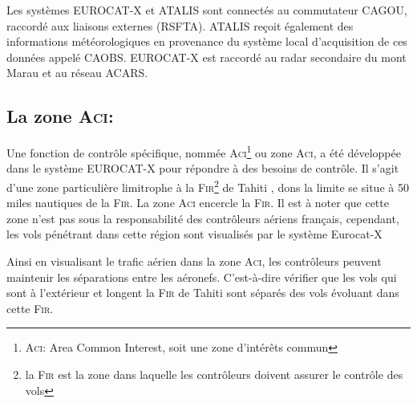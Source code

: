 Les systèmes EUROCAT-X et ATALIS sont connectés au commutateur CAGOU, raccordé aux liaisons externes (RSFTA). ATALIS reçoit également des informations météorologiques en provenance du système local d’acquisition de ces données appelé CAOBS. EUROCAT-X est raccordé au radar secondaire du mont Marau et au réseau ACARS.

    \subsection{La zone \textsc{Aci}:\label{Aci}}
Une fonction de contrôle spécifique, nommée \textsc{Aci}\footnote{\textsc{Aci}: Area Common Interest, soit une zone d'intérêts commun} ou zone \textsc{Aci}, a été développée dans le système EUROCAT-X pour répondre à des besoins de contrôle. Il s’agit d’une zone particulière limitrophe à la \textsc{Fir}\footnote{\label{Fir} la \textsc{Fir} est la zone dans laquelle les contrôleurs doivent assurer le contrôle des vols} de Tahiti , dons la limite se situe à 50 miles nautiques de la \textsc{Fir}. La zone \textsc{Aci} encercle la \textsc{Fir}. Il est à noter que cette zone n’est pas sous la responsabilité des contrôleurs aériens français, cependant, les vols pénétrant dans cette région sont visualisés par le système Eurocat-X 

Ainsi en visualisant le trafic aérien dans la zone \textsc{Aci}, les contrôleurs peuvent maintenir les séparations entre les aéronefs. C'est-à-dire vérifier que les vols qui sont à l’extérieur et longent la \textsc{Fir} de Tahiti sont séparés des vols évoluant dans cette \textsc{Fir}.
